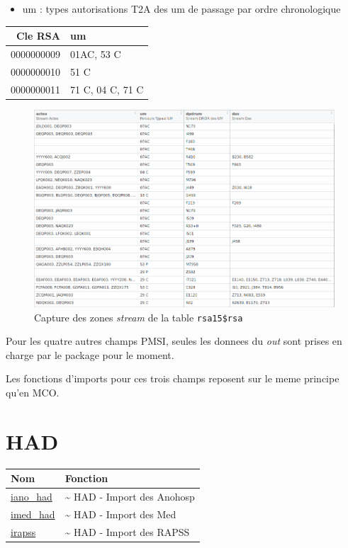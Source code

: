 \documentclass[]{book}
\providecommand{\tightlist}{%
  \setlength{\itemsep}{0pt}\setlength{\parskip}{0pt}}
\begin{document}
\begin{itemize}
\tightlist
\item
  um : types autorisations T2A des um de passage par ordre chronologique
\end{itemize}

\begin{longtable}[]{@{}rl@{}}
\toprule
Cle RSA & um\tabularnewline
\midrule
\endhead
0000000009 & 01AC, 53 C\tabularnewline
0000000010 & 51 C\tabularnewline
0000000011 & 71 C, 04 C, 71 C\tabularnewline
\bottomrule
\end{longtable}

\begin{figure}[htbp]
\centering
\includegraphics{images/rsa_stream.png}
\caption{Capture des zones \emph{stream} de la table
\texttt{rsa15\$rsa}}
\end{figure}

Pour les quatre autres champs PMSI, seules les donnees du \emph{out}
sont prises en charge par le package pour le moment.

Les fonctions d'imports pour ces trois champs reposent sur le meme
principe qu'en MCO.

\section{HAD}\label{had}

\begin{longtable}[]{@{}ll@{}}
\toprule
Nom & Fonction\tabularnewline
\midrule
\endhead
\href{https://github.com/IM-APHP/pmeasyr/tree/master/Rd_md/iano_had.Rmd}{iano\_had}
& \textasciitilde{} HAD - Import des Anohosp\tabularnewline
\href{https://github.com/IM-APHP/pmeasyr/tree/master/Rd_md/imed_had.Rmd}{imed\_had}
& \textasciitilde{} HAD - Import des Med\tabularnewline
\href{https://github.com/IM-APHP/pmeasyr/tree/master/Rd_md/irapss.Rmd}{irapss}
& \textasciitilde{} HAD - Import des RAPSS\tabularnewline
\bottomrule
\end{longtable}
\end{document}
